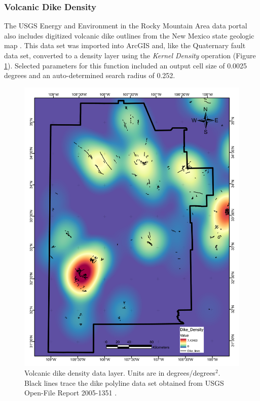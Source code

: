 \subsubsection{Volcanic Dike Density}

The USGS Energy and Environment in the Rocky Mountain Area data portal \citep{usgs_eerma_2021} also includes digitized volcanic dike outlines from the New Mexico state geologic map \citep{stoeser_new_2005-1}. This data set was imported into ArcGIS and, like the Quaternary fault data set, converted to a density layer using the \textit{Kernel Density} operation (Figure \ref{fig:feat_dikes}). Selected parameters for this function included an output cell size of 0.0025 degrees and an auto-determined search radius of 0.252.

\begin{figure}[!htp]
\centering
\includegraphics[scale=.50]{templates/images/Figure-DikeDensity.pdf}
\caption[Volcanic dike data layer]{Volcanic dike density data layer. Units are in degrees/degrees$^2$. Black lines trace the dike polyline data set obtained from USGS Open-File Report 2005-1351 \protect\citep{stoeser_new_2005-1}.}
\label{fig:feat_dikes}
\end{figure}

